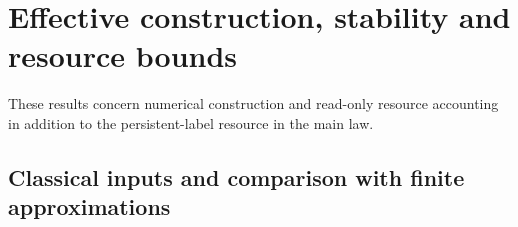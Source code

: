 \documentclass[11pt]{amsart}
\theoremstyle{definition}\newtheorem{definition}[theorem]{Definition}
\theoremstyle{remark}\newtheorem{remark}[theorem]{Remark}
\begin{document}
\section{Effective construction, stability and resource bounds}
\label{app:effective}
These results concern numerical construction and read-only resource
accounting in addition to the persistent-label resource in the main law.
\begingroup
\let\section\subsection
\let\subsection\subsubsection
\let\subsubsection\paragraph





\endgroup
\section{Classical inputs and comparison with finite approximations}
\label{app:comparison}\label{sec:literature-comparison}





\end{document}
